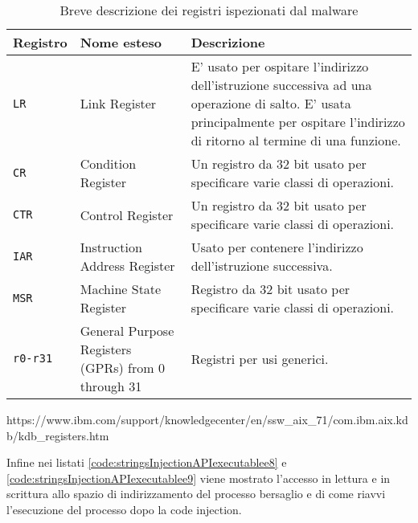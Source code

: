 \documentclass[10pt,a4paper, titlepage]{report}
\begin{document}
\begin{table}[h!]
  \begin{center}
    \caption{Breve descrizione dei registri ispezionati dal malware}
    \centering
    \begin{adjustbox}{width=1.5\textwidth,center=\textwidth}
    \label{tab:assembly1}
    
    \begin{tabular}{l|l|p{8cm}}
      \toprule
      Registro & Nome esteso & Descrizione \\
      \midrule
      \texttt{LR} & Link Register & E' usato per ospitare l'indirizzo dell'istruzione successiva ad una operazione di salto. E' usata principalmente per ospitare l'indirizzo di ritorno al termine di una funzione. \\
      
      \texttt{CR} & Condition Register & Un registro da 32 bit usato per specificare varie classi di operazioni.\\
      
      \texttt{CTR} & Control Register & Un registro da 32 bit usato per specificare varie classi di operazioni.\\
      
      \texttt{IAR} & Instruction Address Register & Usato per contenere l'indirizzo dell'istruzione successiva.\\
      
      \texttt{MSR} & Machine State Register & Registro da 32 bit usato per specificare varie classi di operazioni.\\
     
	\texttt{r0-r31} & General Purpose Registers (GPRs) from 0 through 31 & Registri per usi generici. \\   
     
      \bottomrule
    \end{tabular}
    \end{adjustbox}
  \end{center}
\end{table}

https://www.ibm.com/support/knowledgecenter/en/ssw\_aix\_71/com.ibm.aix.kdb/kdb\_registers.htm


Infine nei listati \ref{code:stringsInjectionAPIexecutablee8} e \ref{code:stringsInjectionAPIexecutablee9} viene mostrato l'accesso in lettura e in scrittura allo spazio di indirizzamento del processo bersaglio e di come riavvi l'esecuzione del processo dopo la code injection.
\end{document}

